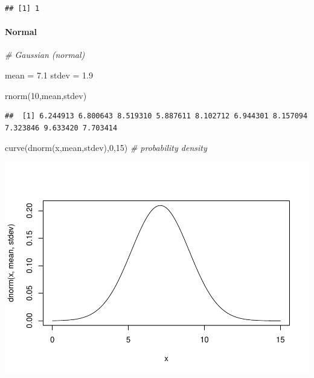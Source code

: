 \documentclass[
]{article}
\newenvironment{Shaded}{\begin{snugshade}}{\end{snugshade}}
\newcommand{\CommentTok}[1]{\textcolor[rgb]{0.56,0.35,0.01}{\textit{#1}}}
\newcommand{\DecValTok}[1]{\textcolor[rgb]{0.00,0.00,0.81}{#1}}
\newcommand{\FloatTok}[1]{\textcolor[rgb]{0.00,0.00,0.81}{#1}}
\newcommand{\FunctionTok}[1]{\textcolor[rgb]{0.00,0.00,0.00}{#1}}
\newcommand{\NormalTok}[1]{#1}
\newcommand{\OtherTok}[1]{\textcolor[rgb]{0.56,0.35,0.01}{#1}}
\begin{document}
\begin{verbatim}
## [1] 1
\end{verbatim}

\hypertarget{normal}{%
\paragraph{Normal}\label{normal}}

\begin{Shaded}
\begin{Highlighting}[]
\CommentTok{\# Gaussian (normal)}

\NormalTok{mean }\OtherTok{=} \FloatTok{7.1}
\NormalTok{stdev }\OtherTok{=} \FloatTok{1.9}

\FunctionTok{rnorm}\NormalTok{(}\DecValTok{10}\NormalTok{,mean,stdev)}
\end{Highlighting}
\end{Shaded}

\begin{verbatim}
##  [1] 6.244913 6.800643 8.519310 5.887611 8.102712 6.944301 8.157094 7.323846 9.633420 7.703414
\end{verbatim}

\begin{Shaded}
\begin{Highlighting}[]
\FunctionTok{curve}\NormalTok{(}\FunctionTok{dnorm}\NormalTok{(x,mean,stdev),}\DecValTok{0}\NormalTok{,}\DecValTok{15}\NormalTok{)   }\CommentTok{\# probability density}
\end{Highlighting}
\end{Shaded}

\includegraphics{LECTURE2_files/figure-latex/unnamed-chunk-21-1.pdf}
\end{document}
